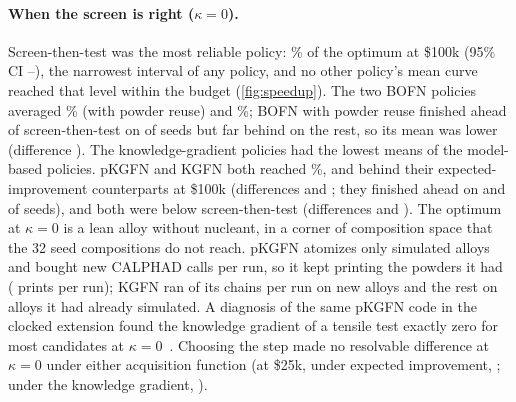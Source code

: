 \documentclass[11pt]{article}
\begin{document}
\paragraph{When the screen is right ($\kappa=0$).} Screen-then-test was the most
reliable policy: \% of the optimum at \$100k (95\% CI
--), the narrowest interval of
any policy, and no other policy's mean curve reached that level within the budget
(\cref{fig:speedup}). The two BOFN policies averaged
\% (with powder reuse) and
\%; BOFN with powder reuse finished ahead of
screen-then-test on  of  seeds
but far behind on the rest, so its mean was \pp{}
lower (difference ). The knowledge-gradient policies had the
lowest means of the model-based policies. pKGFN and KGFN both reached
\%,
\pp{} and \pp{}
behind their expected-improvement counterparts at \$100k (differences
 and ; they finished
ahead on  and 
of  seeds), and both were \pp{} below
screen-then-test (differences  and
). The optimum at $\kappa=0$ is a
lean alloy without nucleant, in a corner of composition space that the 32 seed
compositions do not reach. pKGFN atomizes only simulated alloys and bought
 new CALPHAD calls per run, so it kept printing the powders it
had ( prints per run); KGFN ran  of its
 chains per run on new alloys and the rest on alloys it had
already simulated. A diagnosis of the same pKGFN code in the clocked extension
found the knowledge gradient of a tensile test exactly zero for most candidates at
$\kappa=0$~. Choosing the step made no resolvable difference
at $\kappa=0$ under either acquisition function (at \$25k, \pp{}
under expected improvement, ; \pp{} under
the knowledge gradient, ).
\end{document}
